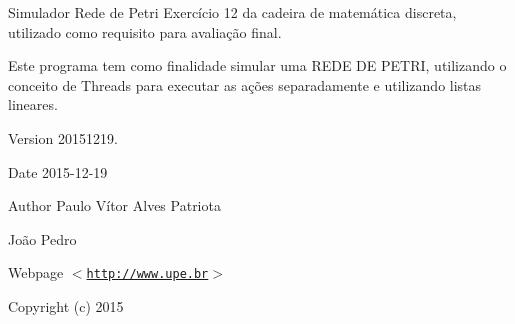 Simulador Rede de Petri Exercício 12 da cadeira de matemática discreta, utilizado como requisito para avaliação final.

Este programa tem como finalidade simular uma R\+E\+D\+E D\+E P\+E\+T\+R\+I, utilizando o conceito de Threads para executar as ações separadamente e utilizando listas lineares.

\begin{DoxyVersion}{Version}
20151219. 
\end{DoxyVersion}
\begin{DoxyDate}{Date}
2015-\/12-\/19
\end{DoxyDate}
\begin{DoxyAuthor}{Author}
Paulo Vítor Alves Patriota 

João Pedro
\end{DoxyAuthor}
\begin{DoxyParagraph}{Webpage}
$<$\href{http://www.upe.br}{\tt http\+://www.\+upe.\+br}$>$
\end{DoxyParagraph}
\begin{DoxyCopyright}{Copyright}
(c) 2015 
\end{DoxyCopyright}
